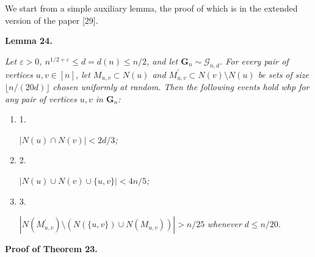 


We start from a simple auxiliary lemma, the proof of which is in the extended version of the paper [29].\par





\par\medskip\noindent\textbf{
\textbf{Lemma 24}\textbf{.}
}\par



\emph{Let $\varepsilon>0$, $n^{1/2+\varepsilon}\leq d=d(n)\leq n/2$, and let $\mathbf{G}_{n}\sim\mathcal{G}_{n,d}$.
For every pair of vertices $u,v\in[n]$, let $M_{u,v}\subset N(u)$ and $M^{\prime}_{u,v}\subset N(v)\setminus N(u)$ be sets of size $\lfloor n/(20d)\rfloor$ chosen uniformly at random. Then the following events hold whp for any pair of vertices $u,v$ in $\mathbf{G}_{n}$:}\par


\begin{enumerate}


\item[] 
1. 


$|N(u)\cap N(v)|<2d/3$\emph{;}\par





\item[] 
2. 


$|N(u)\cup N(v)\cup\{u,v\}|<4n/5$\emph{;}\par





\item[] 
3. 


$|N(M^{\prime}_{u,v})\setminus(N(\{u,v\})\cup N(M_{u,v}))|>n/25$\emph{ whenever }$d\leq n/20$\emph{.}\par





\end{enumerate}






\par\medskip\noindent\textbf{Proof of Theorem 23.}\par




